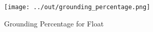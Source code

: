 \documentclass{ametsocV5}
\begin{document}
%

%
\begin{figure}[t]
 \noindent\texttt{[image: ../out/grounding\_percentage.png]}\\
 \caption{Grounding Percentage for Float}
\end{figure}
\end{document}

